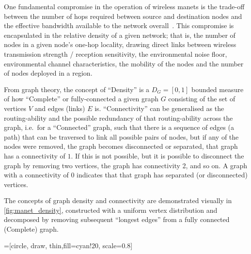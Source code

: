 One fundamental compromise in the operation of wireless \glspl{manet} is the trade-off between the number of hops required between source and destination nodes and the effective bandwidth available to the network overall~\cite{Royer2001}.
This compromise is encapsulated in the relative density of a given network; that is, the number of nodes in a given node's one-hop locality, drawing direct links between wireless transmission strength / reception sensitivity, the environmental noise floor, environmental channel characteristics, the mobility of the nodes and the number of nodes deployed in a region.

From graph theory, the concept of ``Density'' is a $D_G=[0,1]$ bounded measure of how ``Complete'' or fully-connected a given graph $G$ consisting of the set of vertices $V$ and edges (links) $E$ is.
``Connectivity'' can be generalised as the routing-ability and the possible redundancy of that routing-ability across the graph, i.e.\ for a ``Connected'' graph, such that there is a sequence of edges (a path) that can be traversed to link all possible pairs of nodes, but if any of the nodes were removed, the graph becomes disconnected or separated, that graph has a connectivity of $1$.
If this is not possible, but it is possible to disconnect the graph by removing two vertices, the graph has connectivity 2, and so on.
A graph with a connectivity of $0$ indicates that that graph has separated (or disconnected) vertices.

The concepts of graph density and connectivity are demonstrated visually in \autoref{fig:manet_density}, constructed with a uniform vertex distribution and decomposed by removing subsequent ``longest edges'' from a fully connected (Complete) graph.


=[circle, draw, thin,fill=cyan!20, scale=0.8]

